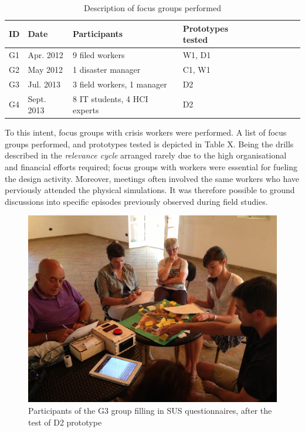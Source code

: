 \begin{table}[h]
\begin{tabular}{@{}lllllllll@{}}    
\toprule
ID  & Date        & Participants      & Prototypes tested \\
\midrule
G1  & Apr. 2012  & 9 filed workers     & W1, D1 \\
G2  & May 2012   & 1 disaster manager  & C1, W1 \\
G3  & Jul. 2013  & 3 field workers, 1 manager & D2 \\
G4  & Sept. 2013 & 8 IT students, 4 HCI experts & D2 \\
\bottomrule
\end{tabular}
\caption{Description of focus groups performed}
\label{prototypes}
\end{table}

To this intent, focus groups with crisis workers were performed. A list
of focus groups performed, and prototypes tested is depicted in Table X.
Being the drills described in the \emph{relevance cycle} arranged rarely
due to the high organisational and financial efforts required; focus
groups with workers were essential for fueling the design activity.
Moreover, meetings often involved the same workers who have perviously
attended the physical simulations. It was therefore possible to ground
discussions into specific episodes previously observed during field
studies.

\begin{figure}[htbp]
\centering
\includegraphics{imgs/d2_prototype.jpg}
\caption{Participants of the G3 group filling in SUS questionnaires,
after the test of D2 prototype}
\end{figure}

